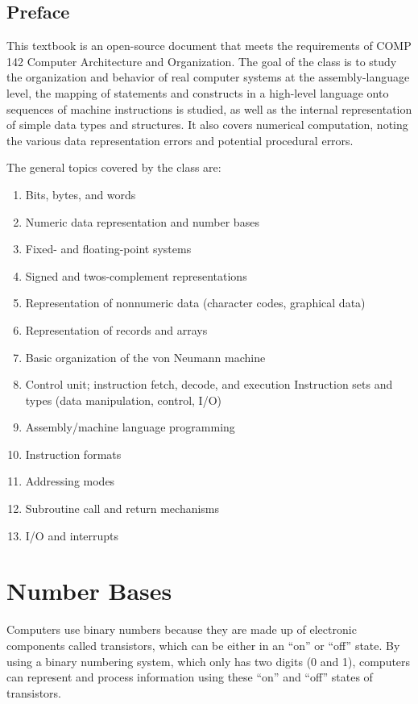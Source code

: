 \documentclass[letterpaper, 10pt]{book}
\begin{document}

\section{Preface\label{sec:preface}}

This textbook is an open-source document that meets the requirements of COMP 142 Computer Architecture and Organization. The goal of the class is to study the organization and behavior of real computer systems at the assembly-language level, the mapping of statements and constructs in a high-level language onto sequences of machine instructions is studied, as well as the internal representation of simple data types and structures. It also covers numerical computation, noting the various data representation errors and potential procedural errors.

The general topics covered by the class are:

\begin{enumerate}
\item Bits, bytes, and words
\item Numeric data representation and number bases
\item Fixed- and floating-point systems
\item Signed and twos-complement representations
\item Representation of nonnumeric data (character codes, graphical data)
\item Representation of records and arrays
\item Basic organization of the von Neumann machine
\item Control unit; instruction fetch, decode, and execution
    Instruction sets and types (data manipulation, control, I/O)
\item Assembly/machine language programming
\item Instruction formats
\item Addressing modes
\item Subroutine call and return mechanisms
\item I/O and interrupts
\end{enumerate}

\chapter{Number Bases\label{sec:data}}
\setcounter{examples}{1}

Computers use binary numbers because they are made up of electronic components called transistors, 
which can be either in an ``on'' or ``off'' state. By using a binary numbering system, which only 
has two digits (0 and 1), computers can represent and process information using these ``on'' and 
``off'' states of transistors.
\end{document}
